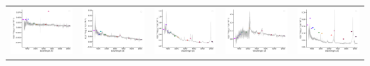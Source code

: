 \begin{center}
\begin{longtable}{l l l l l }
    \includegraphics[width=0.2\linewidth, clip]{Figs/Figs-sdss/spec-9180-57693-0928-STRIPE82-0121-040706.pdf} & \includegraphics[width=0.2\linewidth, clip]{Figs/Figs-sdss/spec-9217-57934-0197-STRIPE82-0143-016256.pdf} & \includegraphics[width=0.2\linewidth, clip]{Figs/Figs-sdss/spec-9217-57934-0839-STRIPE82-0143-016137.pdf} & \includegraphics[width=0.2\linewidth, clip]{Figs/Figs-sdss/spec-9218-57724-0804-STRIPE82-0145-045634.pdf} & \includegraphics[width=0.2\linewidth, clip]{Figs/Figs-sdss/spec-9230-58021-0675-STRIPE82-0125-053114.pdf} \\

\end{longtable}
\end{center}
